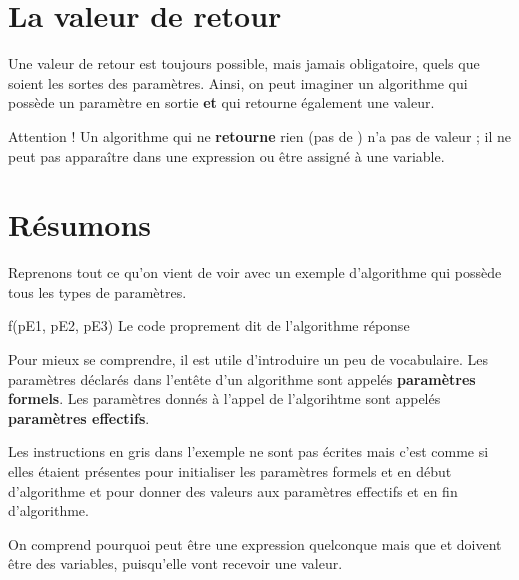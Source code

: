 \section{La valeur de retour}
	
	Une valeur de retour est toujours possible,
	mais jamais obligatoire,
	quels que soient les sortes des paramètres.
	Ainsi, on peut imaginer un algorithme
	qui possède un paramètre en sortie \textbf{et}
	qui retourne également une valeur.

	Attention !
	Un algorithme qui ne \textbf{retourne} rien (pas de \Gives)
	n'a pas de valeur ;
	il ne peut pas apparaître dans une expression
	ou être assigné à une variable.

\section{Résumons}

	Reprenons tout ce qu'on vient de voir
	avec un exemple d'algorithme qui possède tous les types de paramètres.

	\begin{LDA}
			\Write f(pE1, pE2, pE3)
		\EndAlgo
		\Empty
			\Empty
			\LComment Le code proprement dit de l'algorithme
			\Empty
			\Return réponse
		\EndAlgo
	\end{LDA}

	Pour mieux se comprendre,
	il est utile d'introduire un peu de vocabulaire.
	Les paramètres déclarés dans l'entête d'un algorithme
	sont appelés \textbf{paramètres formels}.
	Les paramètres donnés à l'appel de l'algorihtme
	sont appelés \textbf{paramètres effectifs}. 
	
	Les instructions en gris dans l'exemple ne sont pas écrites
	mais c'est comme si elles étaient présentes
	pour initialiser les paramètres formels \In{} et \InOut{}
	en début d'algorithme
	et pour donner des valeurs 
	aux paramètres effectifs \Out{} et \InOut{}
	en fin d'algorithme.
	
	On comprend pourquoi  peut être une expression quelconque
	mais que  et  doivent être des variables,
	puisqu'elle vont recevoir une valeur.
	
